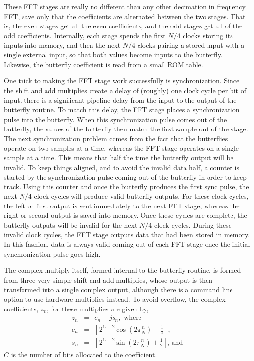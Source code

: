 \documentclass{gqtekspec}
\begin{document}
These FFT stages are really no different than any other decimation in 
frequency FFT, save only that the coefficients are alternated between the
two stages.  That is, the even stages get all the even coefficients, and
the odd stages get all of the odd coefficients.
Internally, each stage spends the first $N/4$ clocks storing its inputs
into memory, and then the next $N/4$ clocks pairing a stored input with
a single external input, so that both values become inputs to the butterfly.
Likewise, the butterfly coefficient is read from a small ROM table.

One trick to making the FFT stage work successfully is synchronization.  Since
the shift and add multiplies create a delay of (roughly) one clock cycle per
bit of input, there is a significant pipeline delay from the input to the
output of the butterfly routine.  To match this delay, the FFT stage places a 
synchronization pulse into the butterfly.  When this synchronization pulse
comes out of the butterfly, the values of the butterfly then match the
first sample out of the stage.  The next synchronization problem comes from
the fact that the butterflies operate on two samples at a time, whereas the
FFT stage operates on a single sample at a time.  This means that half the
time the butterfly output will be invalid.  To keep things aligned, and to 
avoid the invalid data half, a counter is started by the synchronization pulse
coming out of the butterfly in order to keep track.  Using this counter and
once the butterfly produces the first sync pulse, the next $N/4$ clock cycles
will produce valid butterfly outputs.  For these clock cycles, the left or
first output is sent immediately to the next FFT stage, whereas the right
or second output is saved into memory.  Once these cycles are complete, the
butterfly outputs will be invalid for the next $N/4$ clock cycles.  During
these invalid clock cycles, the FFT stage outputs data that had been stored
in memory.  In this fashion, data is always valid coming out of each FFT
stage once the initial synchronization pulse goes high.

The complex multiply itself, formed internal to the butterfly routine, is
formed from three very simple shift and add multiplies, whose output is
then transformed into a single complex output, although there is a command
line option to use hardware multiplies instead.  To avoid overflow, the
complex coefficients, $z_n$, for these multiplies are given by,
\begin{eqnarray}
z_n &=& c_n + js_n,\mbox{ where} \\
c_n &=& \left\lfloor 2^{C-2}\cos\left(2\pi \frac{n}{N}\right)+\frac{1}{2}\right\rfloor,\\
s_n &=& \left\lfloor 2^{C-2}\sin\left(2\pi \frac{n}{N}\right)+\frac{1}{2}\right\rfloor\mbox{, and}
\end{eqnarray}
$C$ is the number of bits allocated to the coefficient.
\end{document}
